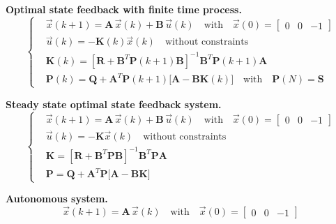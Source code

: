 \documentclass[12pt,a4paper,oneside]{book}
\begin{document}
\begin{onehalfspace}
\noindent\textbf{Optimal state feedback with finite time process.}
\begin{equation}
	\left\lbrace \begin{aligned}
		& \vec{x}(k+1)=\mathbf{A}\,\vec{x}(k)+\mathbf{B}\,\vec{u}(k) \quad 
		\text{with} \quad \vec{x}(0) = \begin{bmatrix} 0&0&-1\end{bmatrix}  
		\\[6pt]
		& \vec{u}(k) = -\mathbf{K}(k)\vec{x}(k) \quad \text{without 
			constraints}\\[6pt]
		& \mathbf{K}(k) = \left[ 
		\mathbf{R}+\mathbf{B}^T\mathbf{P}(k+1)\mathbf{B}\right]^{-1}\mathbf{B}^T\mathbf{P}(k+1)
		\mathbf{A} \\[6pt]
		& \mathbf{P}(k) =\mathbf{Q}+\mathbf{A}^T\mathbf{P}(k+1)\Big[ 
		\mathbf{A} -\mathbf{B}\mathbf{K}(k)\Big] \quad \text{with} \quad 
		\mathbf{P}(N) =\mathbf{S}
	\end{aligned}\right. 
\end{equation}
\vspace{10mm}

\noindent\textbf{Steady state optimal state feedback system.}
\begin{equation}
	\left\lbrace \begin{aligned}
		& \vec{x}(k+1)=\mathbf{A}\,\vec{x}(k)+\mathbf{B}\,\vec{u}(k) \quad 
		\text{with} \quad \vec{x}(0) = \begin{bmatrix} 0&0&-1\end{bmatrix}  
		\\[6pt]
		& \vec{u}(k) = -\mathbf{K}\vec{x}(k) \quad \text{without 
			constraints}\\[6pt]
		& \mathbf{K} = \left[ 
		\mathbf{R}+\mathbf{B}^T\mathbf{P}\mathbf{B}\right]^{-1}\mathbf{B}^T\mathbf{P}
		\mathbf{A} \\[6pt]
		& \mathbf{P} =\mathbf{Q}+\mathbf{A}^T\mathbf{P}\Big[\mathbf{A} 
		-\mathbf{B}\mathbf{K}\Big]
	\end{aligned}\right. 
\end{equation}
\vspace{10mm}

\noindent\textbf{Autonomous system.}
\begin{equation}
	\vec{x}(k+1)=\mathbf{A}\,\vec{x}(k) \quad \text{with} \quad \vec{x}(0) = 
	\begin{bmatrix} 0&0&-1\end{bmatrix}
\end{equation}
\vspace{10mm}


\end{onehalfspace}
\end{document}
